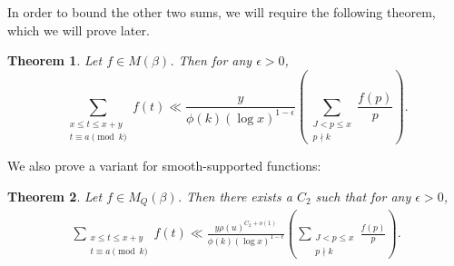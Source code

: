\documentclass{amsart}
\newtheorem{theorem}{Theorem}[section]
\begin{document}
In order to bound the other two sums, we will require the following theorem, which we will prove later.
\begin{theorem}\label{roughbd}
Let $f\in M(\beta)$.  Then for any $\epsilon>0$,
$$\sum_{\substack{x\leq t\leq x+y \\ t\equiv a\pmod k}}f(t)\ll \frac{y}{\phi(k)(\log x)^{1-\epsilon}}\left(\sum_{\substack{J<p\leq x \\ p\nmid k}}\frac{f(p)}{p}\right).$$
\end{theorem}

We also prove a variant for smooth-supported functions:
\begin{theorem}\label{roughbd2}
Let $f\in M_Q(\beta)$. Then there exists a $C_2$ such that for any $\epsilon>0$,
\begin{gather}\label{rbdpart1}\sum_{\substack{x\leq t\leq x+y \\ t\equiv a\pmod k}}f(t)\ll \frac{y\rho(u)^{C_2+o(1)}}{\phi(k)(\log x)^{1-\epsilon}}\left(\sum_{\substack{J<p\leq x \\ p\nmid k}}\frac{f(p)}{p}\right).
\end{gather}
\end{theorem}

%
\end{document}
